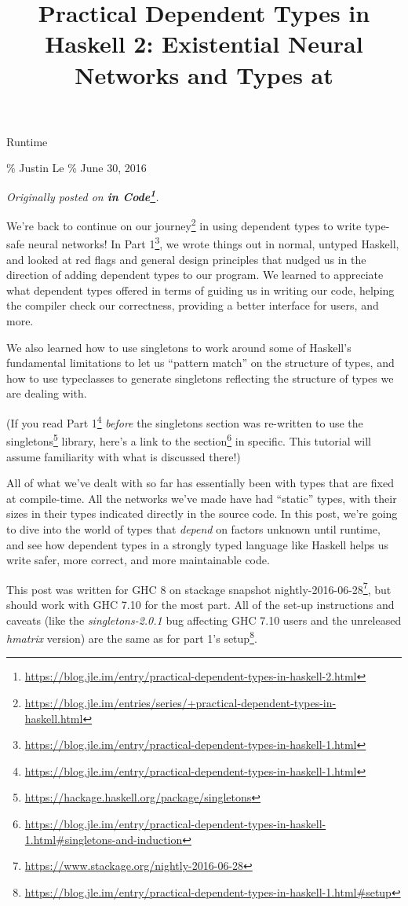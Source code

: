 \documentclass[]{article}
\title{Practical Dependent Types in Haskell 2: Existential Neural Networks and
Types at}
\renewcommand{\href}[2]{#2\footnote{\url{#1}}}
\begin{document}
\maketitle

Runtime

\% Justin Le \% June 30, 2016

\emph{Originally posted on
\textbf{\href{https://blog.jle.im/entry/practical-dependent-types-in-haskell-2.html}{in
Code}}.}

We're back to continue on
\href{https://blog.jle.im/entries/series/+practical-dependent-types-in-haskell.html}{our
journey} in using dependent types to write type-safe neural networks! In
\href{https://blog.jle.im/entry/practical-dependent-types-in-haskell-1.html}{Part
1}, we wrote things out in normal, untyped Haskell, and looked at red flags and
general design principles that nudged us in the direction of adding dependent
types to our program. We learned to appreciate what dependent types offered in
terms of guiding us in writing our code, helping the compiler check our
correctness, providing a better interface for users, and more.

We also learned how to use singletons to work around some of Haskell's
fundamental limitations to let us ``pattern match'' on the structure of types,
and how to use typeclasses to generate singletons reflecting the structure of
types we are dealing with.

(If you read
\href{https://blog.jle.im/entry/practical-dependent-types-in-haskell-1.html}{Part
1} \emph{before} the singletons section was re-written to use the
\href{https://hackage.haskell.org/package/singletons}{singletons} library,
\href{https://blog.jle.im/entry/practical-dependent-types-in-haskell-1.html\#singletons-and-induction}{here's
a link to the section} in specific. This tutorial will assume familiarity with
what is discussed there!)

All of what we've dealt with so far has essentially been with types that are
fixed at compile-time. All the networks we've made have had ``static'' types,
with their sizes in their types indicated directly in the source code. In this
post, we're going to dive into the world of types that \emph{depend} on factors
unknown until runtime, and see how dependent types in a strongly typed language
like Haskell helps us write safer, more correct, and more maintainable code.

This post was written for GHC 8 on stackage snapshot
\href{https://www.stackage.org/nightly-2016-06-28}{nightly-2016-06-28}, but
should work with GHC 7.10 for the most part. All of the set-up instructions and
caveats (like the \emph{singletons-2.0.1} bug affecting GHC 7.10 users and the
unreleased \emph{hmatrix} version) are the same as for
\href{https://blog.jle.im/entry/practical-dependent-types-in-haskell-1.html\#setup}{part
1's setup}.
\end{document}
